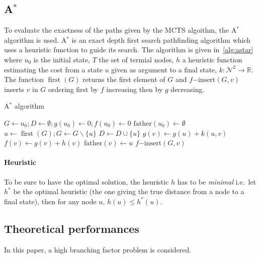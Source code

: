 \documentclass[oneside,twocolumn]{article}
\DeclareMathOperator{\first}{first}
\begin{document}
\subsection{A\(^*\)}
To evaluate the exactness of the paths given by the MCTS algoithm, the A\(^*\)
algorithm is used. A\(^*\) is an exact depth first search pathfinding algorithm
which uses a heuristic function to guide its search. The algorithm is given
in~\ref{alg:astar} where \(u_0\) is the initial state, \(T\) the set of termial
nodes, \(h\) a heuristic function estimating the cost from a state \(u\) given
as argument to a final state, \(k \colon \mathcal{N}^2 \to \mathbb{R}\). The
function \(\first(G)\) returns the first element of \(G\) and
\(f\mathup{-insert}(G, v)\) inserts \(v\) in \(G\) ordering first by \(f\)
increasing then by \(g\) decreasing.
\begin{algorithm}
  \caption{A\(^*\) algorithm~\cite{alliotschiex2002ia&it}}\label{alg:astar}
  \begin{algorithmic}
    \State{}\(G \gets u_0; D \gets \emptyset; g(u_0) \gets 0; f(u_0) \gets 0\)
    \State{}\(\mathup{father}(u_0) \gets \emptyset\)
    \State{}\(u \gets \first(G); G \gets G \backslash \{u\}\)
    \State{}\(D \gets D \cup \{u\}\)
    \State{}
    \EndIf{}
    \State{}\(g(v) \gets g(u) + k(u, v)\)
    \State{}\(f(v) \gets g(v) + h(v)\)
    \State{}\(\mathup{father}(v) \gets u\)
    \State{}\(f\mathup{-insert}(G, v)\)
    \EndIf{}
    \EndFor{}
    \EndWhile{}
    \EndProcedure{}
  \end{algorithmic}
\end{algorithm}

\paragraph{Heuristic}
To be sure to have the optimal solution, the heuristic \(h\) has to be
\emph{minimal} i.e.\ let \(h^*\) be the optimal heuristic (the one giving the
true distance from a node to a final state), then for any node \(u\), \(h(u)
\leq h^*(u)\).


\subsection{Theoretical performances}
In this paper, a high branching factor problem is considered.
\end{document}
